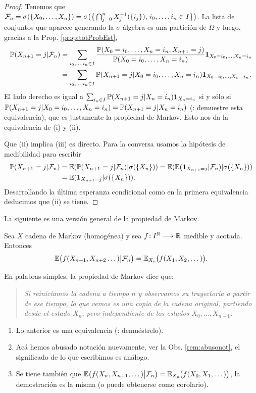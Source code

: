 \begin{proof}
Tenemos que $\mathcal{F}_n=\sigma(\{X_0,\dotsc,X_n\})=\sigma\big(\big\{\bigcap_{j=0}^nX_j^{-1}(\{i_j\}),\,i_0,\dotsc,i_n\in I\big\}\big)$.
La lista de conjuntos que aparece generando la $\sigma$-álgebra es una partición de $\Omega$ y luego, gracias a la Prop. \ref{prop:totProbEst},
\begin{align}
\mathbb{P}(X_{n+1}=j|\mathcal{F}_n)&=\sum_{i_0,\dotsc,i_n\in I}\frac{\mathbb{P}(X_0=i_0,\dotsc,X_n=i_n,X_{n+1}=j)}{\mathbb{P}(X_0=i_0,\dotsc,X_n=i_n)}\mathbf{1}_{X_0=i_0,\dotsc,X_n=i_n}\\
&=\sum_{i_0,\dotsc,i_n\in I}\mathbb{P}(X_{n+1}=j|X_0=i_0,\dotsc,X_n=i_n)\mathbf{1}_{X_0=i_0,\dotsc,X_n=i_n}.
\end{align}
El lado derecho es igual a $\sum_{i_n\in I}\mathbb{P}(X_{n+1}=j|X_n=i_n)\mathbf{1}_{X_n=i_n}$ si y sólo si $\mathbb{P}(X_{n+1}=j|X_0=i_0,\dotsc,X_n=i_n)=\mathbb{P}(X_{n+1}=j|X_n=i_n)$ (\uexers: demuestre esta equivalencia), que es justamente la propiedad de Markov.
Esto nos da la equivalencia de (i) y (ii).

Que (ii) implica (iii) es directo.
Para la conversa usamos la hipótesis de medibilidad para escribir
\begin{align}
\mathbb{P}(X_{n+1}=j|\mathcal{F}_n)&=\mathbb{E}(\mathbb{P}(X_{n+1}=j|\mathcal{F}_n)|\sigma(\{X_n\}))=\mathbb{E}(\mathbb{E}(\mathbf{1}_{X_{n+1}=j}|\mathcal{F}_n)|\sigma(\{X_n\}))\\
&=\mathbb{E}(\mathbf{1}_{X_{n+1}=j}|\sigma(\{X_n\})).
\end{align}
Desarrollando la última esperanza condicional como en la primera equivalencia deducimos que (ii) se tiene.
\end{proof}

La siguiente es una versión general de la propiedad de Markov.

\begin{thm}\label{thm:propMarkGen}
Sea $X$ cadena de Markov (homogénea) y sea $f\!:I^{\mathbb{N}}\longrightarrow\mathbb{R}$ medible y acotada.
Entonces
\[\mathbb{E}\big(f(X_{n+1},X_{n+2}\dotsc)\big|\mathcal{F}_n\big)=\mathbb{E}_{X_n}\hspace{-0.1em}\big(f(X_1,X_2,\dotsc)\big).\]
\end{thm}

En palabras simples, la propiedad de Markov dice que:
\begin{quote}
\emph{Si reiniciamos la cadena a tiempo $n$ y observamos su trayectoria a partir de ese tiempo, lo que vemos es una copia de la cadena original, partiendo desde el estado $X_n$, pero independiente de los estados $X_0,\dotsc,X_{n-1}$.}
\end{quote}

\begin{rem}
\leavevmode
\begin{enumerate}[label=(\roman*)]
\item Lo anterior es una equivalencia (\uexers{}: demuéstrelo).
\item Acá hemos abusado notación nuevamente, ver la Obs. \ref{rem:abusonot}, el significado de lo que escribimos es análogo.
\item Se tiene también que $\mathbb{E}\big(f(X_{n},X_{n+1},\dotsc)\big|\mathcal{F}_n\big)=\mathbb{E}_{X_n}\hspace{-0.1em}\big(f(X_0,X_1,\dotsc)\big)$, la demostración es la misma (o puede obtenerse como corolario).
\end{enumerate}
\end{rem}

